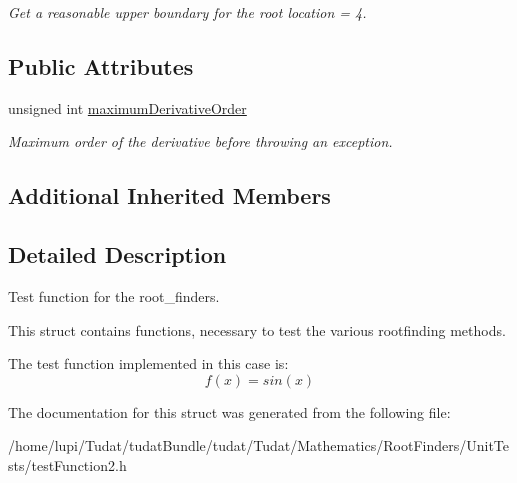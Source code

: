 \begin{DoxyCompactItemize}
\begin{DoxyCompactList}\small\item\em Get a reasonable upper boundary for the root location = 4. \end{DoxyCompactList}\end{DoxyCompactItemize}
\subsection*{Public Attributes}
\begin{DoxyCompactItemize}
\item 
unsigned int \hyperlink{structtudat_1_1unit__tests_1_1TestFunction2_a21b7ba9b5430f9930dd7b06e3d2c6711}{maximum\+Derivative\+Order}\hypertarget{structtudat_1_1unit__tests_1_1TestFunction2_a21b7ba9b5430f9930dd7b06e3d2c6711}{}\label{structtudat_1_1unit__tests_1_1TestFunction2_a21b7ba9b5430f9930dd7b06e3d2c6711}

\begin{DoxyCompactList}\small\item\em Maximum order of the derivative before throwing an exception. \end{DoxyCompactList}\end{DoxyCompactItemize}
\subsection*{Additional Inherited Members}


\subsection{Detailed Description}
Test function for the root\+\_\+finders. 

This struct contains functions, necessary to test the various rootfinding methods.

The test function implemented in this case is\+: \[ f(x) = sin(x) \] 

The documentation for this struct was generated from the following file\+:\begin{DoxyCompactItemize}
\item 
/home/lupi/\+Tudat/tudat\+Bundle/tudat/\+Tudat/\+Mathematics/\+Root\+Finders/\+Unit\+Tests/test\+Function2.\+h\end{DoxyCompactItemize}
